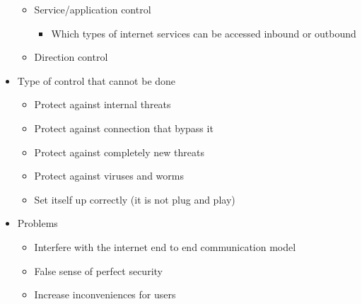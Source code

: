 \documentclass{article}
\begin{document}
\begin{itemize}
    \begin{itemize}
      \item Service/application control
        \begin{itemize}
          \item Which types of internet services can be accessed inbound or outbound
        \end{itemize}
      \item Direction control
    \end{itemize}
  \item Type of control that cannot be done
    \begin{itemize}
      \item Protect against internal threats
      \item Protect against connection that bypass it
      \item Protect against completely new threats
      \item Protect against viruses and worms
      \item Set itself up correctly (it is not plug and play)
    \end{itemize}
  \item Problems 
    \begin{itemize}
      \item Interfere with the internet end to end communication model
      \item False sense of perfect security
      \item Increase inconveniences for users
    \end{itemize}
\end{itemize}
\end{document}
